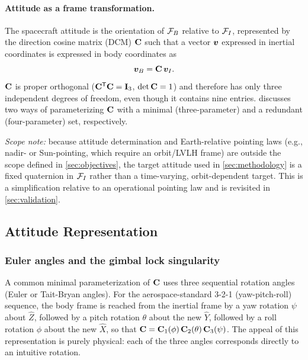 \paragraph{Attitude as a frame transformation.} The spacecraft attitude is the orientation of $\mathcal{F}_B$ relative to $\mathcal{F}_I$, represented by the direction cosine matrix (DCM) $\mathbf{C}$ such that a vector $\bm{v}$ expressed in inertial coordinates is expressed in body coordinates as
\begin{equation}
    \bm{v}_B = \mathbf{C}\,\bm{v}_I .
    \label{eq:dcm_transform}
\end{equation}
$\mathbf{C}$ is proper orthogonal ($\mathbf{C}^{\mathsf{T}}\mathbf{C} = \mathbf{I}_3$, $\det\mathbf{C}=1$) and therefore has only three independent degrees of freedom, even though it contains nine entries.  discusses two ways of parameterizing $\mathbf{C}$ with a minimal (three-parameter) and a redundant (four-parameter) set, respectively.

\emph{Scope note:} because attitude determination and Earth-relative pointing laws (e.g., nadir- or Sun-pointing, which require an orbit/LVLH frame) are outside the scope defined in \cref{sec:objectives}, the target attitude used in \cref{sec:methodology} is a fixed quaternion in $\mathcal{F}_I$ rather than a time-varying, orbit-dependent target. This is a simplification relative to an operational pointing law and is revisited in \cref{sec:validation}.

\subsection{Attitude Representation}
\label{sec:attitude_rep}

\subsubsection{Euler angles and the gimbal lock singularity}

A common minimal parameterization of $\mathbf{C}$ uses three sequential rotation angles (Euler or Tait-Bryan angles). For the aerospace-standard 3-2-1 (yaw-pitch-roll) sequence, the body frame is reached from the inertial frame by a yaw rotation $\psi$ about $\hat{Z}$, followed by a pitch rotation $\theta$ about the new $\hat{Y}$, followed by a roll rotation $\phi$ about the new $\hat{X}$, so that $\mathbf{C} = \mathbf{C}_1(\phi)\,\mathbf{C}_2(\theta)\,\mathbf{C}_3(\psi)$. The appeal of this representation is purely physical: each of the three angles corresponds directly to an intuitive rotation.

